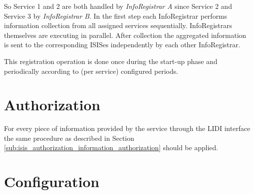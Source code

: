\documentclass{book}
\begin{document}
So Service 1 and 2 are both handled by \textit{InfoRegistrar A} since Service 2 and Service 3 by \textit{InfoRegistrar B}.
In the first step each InfoRegistrar performs information collection from all assigned services sequentially. InfoRegistrars themselves are executing in parallel. After collection  the aggregated information is sent to the corresponding ISISes independently by each other InfoRegistrar.

\begin{figure}[ht]
\end{figure}

This registration operation is done once during the start-up phase and periodically according to 
(per service) configured periods.



\section{Authorization}
\label{sec:service_authorization}

For every piece of information provided by the service through the LIDI interface the same procedure as described in 
Section \ref{sub:isis_authorization_information_authorization} should be applied.



\section{Configuration}
\label{sec:service_configuration}
\end{document}
